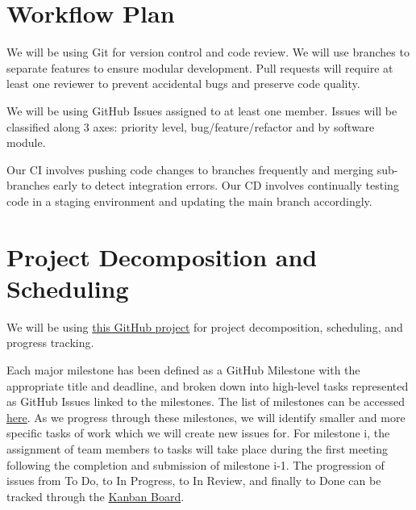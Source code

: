 \documentclass{article}
\begin{document}
\section{Workflow Plan}

We will be using Git for version control and code review. We will use branches to separate features to ensure modular development.
Pull requests will require at least one reviewer to prevent accidental bugs and preserve code quality.

We will be using GitHub Issues assigned to at least one member. Issues will be classified along 3 axes: priority level, bug/feature/refactor and by software module.

Our CI involves pushing code changes to branches frequently and merging sub-branches early to detect integration errors. Our CD involves continually
testing code in a staging environment and updating the main branch accordingly.

\section{Project Decomposition and Scheduling}



We will be using \href{https://github.com/users/meena-alomran/projects/5}
{this GitHub project} for project decomposition, scheduling, and progress tracking.

Each major milestone has been defined as a GitHub Milestone with the appropriate title and
deadline, and broken down into high-level tasks represented as GitHub Issues linked to the milestones. The list of
milestones can be accessed \href{https://github.com/meena-alomran/game-n-grow/milestones?sort=due_date&direction=asc}{here}.
As we progress through these milestones, we will identify smaller and more specific tasks
of work which we will create new issues for. For milestone i, the assignment of team members to
tasks will take place during the first meeting following the completion and submission of milestone i-1.
The progression of issues from To Do, to In Progress, to In Review, and finally to Done can be
tracked through the \href{https://github.com/users/meena-alomran/projects/5/views/2}{Kanban Board}.
\end{document}

